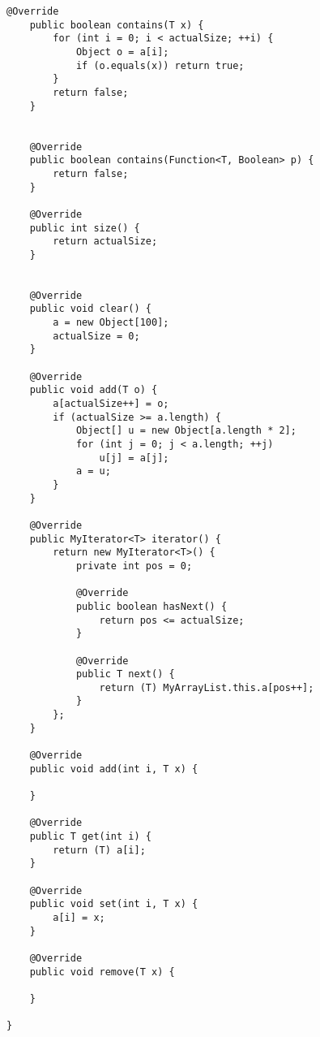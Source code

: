 \begin{lstlisting}[basicstyle=\small,]
    @Override
    public boolean contains(T x) {
        for (int i = 0; i < actualSize; ++i) {
            Object o = a[i];
            if (o.equals(x)) return true;
        }
        return false;
    }


    @Override
    public boolean contains(Function<T, Boolean> p) {
        return false;
    }

    @Override
    public int size() {
        return actualSize;
    }


    @Override
    public void clear() {
        a = new Object[100];
        actualSize = 0;
    }

    @Override
    public void add(T o) {
        a[actualSize++] = o;
        if (actualSize >= a.length) {
            Object[] u = new Object[a.length * 2];
            for (int j = 0; j < a.length; ++j)
                u[j] = a[j];
            a = u;
        }
    }

    @Override
    public MyIterator<T> iterator() {
        return new MyIterator<T>() {
            private int pos = 0;

            @Override
            public boolean hasNext() {
                return pos <= actualSize;
            }

            @Override
            public T next() {
                return (T) MyArrayList.this.a[pos++];
            }
        };
    }

    @Override
    public void add(int i, T x) {

    }

    @Override
    public T get(int i) {
        return (T) a[i];
    }

    @Override
    public void set(int i, T x) {
        a[i] = x;
    }

    @Override
    public void remove(T x) {

    }

}
\end{lstlisting}

